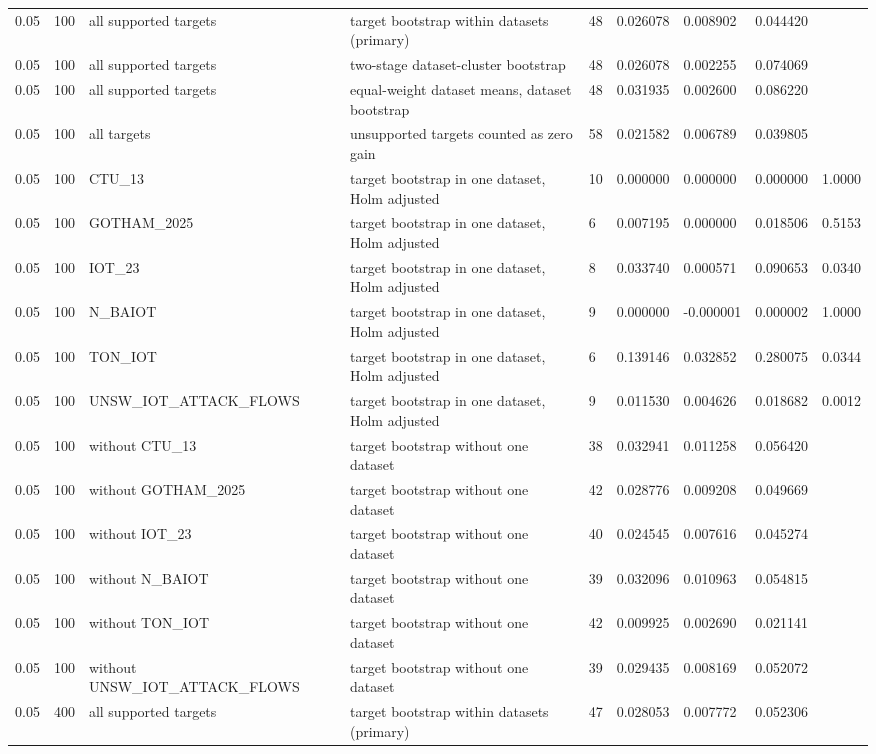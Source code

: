 \begin{tabular}{lllllllll}
0.05 & 100 & all supported targets & target bootstrap within datasets (primary) & 48 & 0.026078 & 0.008902 & 0.044420 &  \\
0.05 & 100 & all supported targets & two-stage dataset-cluster bootstrap & 48 & 0.026078 & 0.002255 & 0.074069 &  \\
0.05 & 100 & all supported targets & equal-weight dataset means, dataset bootstrap & 48 & 0.031935 & 0.002600 & 0.086220 &  \\
0.05 & 100 & all targets & unsupported targets counted as zero gain & 58 & 0.021582 & 0.006789 & 0.039805 &  \\
0.05 & 100 & CTU\_13 & target bootstrap in one dataset, Holm adjusted & 10 & 0.000000 & 0.000000 & 0.000000 & 1.0000 \\
0.05 & 100 & GOTHAM\_2025 & target bootstrap in one dataset, Holm adjusted & 6 & 0.007195 & 0.000000 & 0.018506 & 0.5153 \\
0.05 & 100 & IOT\_23 & target bootstrap in one dataset, Holm adjusted & 8 & 0.033740 & 0.000571 & 0.090653 & 0.0340 \\
0.05 & 100 & N\_BAIOT & target bootstrap in one dataset, Holm adjusted & 9 & 0.000000 & -0.000001 & 0.000002 & 1.0000 \\
0.05 & 100 & TON\_IOT & target bootstrap in one dataset, Holm adjusted & 6 & 0.139146 & 0.032852 & 0.280075 & 0.0344 \\
0.05 & 100 & UNSW\_IOT\_ATTACK\_FLOWS & target bootstrap in one dataset, Holm adjusted & 9 & 0.011530 & 0.004626 & 0.018682 & 0.0012 \\
0.05 & 100 & without CTU\_13 & target bootstrap without one dataset & 38 & 0.032941 & 0.011258 & 0.056420 &  \\
0.05 & 100 & without GOTHAM\_2025 & target bootstrap without one dataset & 42 & 0.028776 & 0.009208 & 0.049669 &  \\
0.05 & 100 & without IOT\_23 & target bootstrap without one dataset & 40 & 0.024545 & 0.007616 & 0.045274 &  \\
0.05 & 100 & without N\_BAIOT & target bootstrap without one dataset & 39 & 0.032096 & 0.010963 & 0.054815 &  \\
0.05 & 100 & without TON\_IOT & target bootstrap without one dataset & 42 & 0.009925 & 0.002690 & 0.021141 &  \\
0.05 & 100 & without UNSW\_IOT\_ATTACK\_FLOWS & target bootstrap without one dataset & 39 & 0.029435 & 0.008169 & 0.052072 &  \\
0.05 & 400 & all supported targets & target bootstrap within datasets (primary) & 47 & 0.028053 & 0.007772 & 0.052306 &  \\

\end{tabular}
